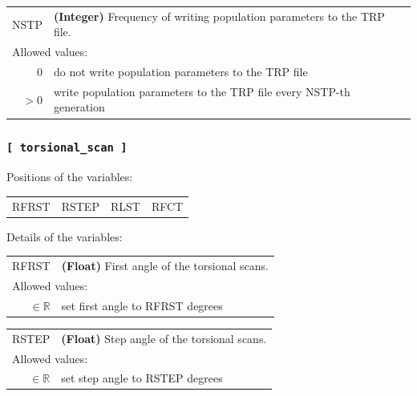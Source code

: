 \documentclass[10pt,a4paper,openany]{memoir}
\numberwithin{equation}{section}
\begin{document}
{
\begin{tabular}{r@{ : }l}
\label{descr:nstp}
      NSTP&\textbf{(Integer)} Frequency of writing population parameters to the TRP file.                                              \\ 
\multicolumn{2}{l}{Allowed values:} \\ 
     \(0\)&do not write population parameters to the TRP file                                                   \\ 
    \(>0\)&write population parameters to the TRP file every NSTP-th generation                                 \\ 
\end{tabular}
\vspace{1ex}
}


\subsubsection{\texttt{[~torsional\_scan~]}}
\label{sec:inp-torsional_scan}

Positions of the variables:
\begin{center}
  \begin{tabular}{llll}
    RFRST & RSTEP & RLST & RFCT \\
  \end{tabular}
\end{center}

\noindent Details of the variables:
\vspace{2ex}

{
\begin{tabular}{r@{ : }l}
\label{descr:rfrst}
     RFRST&\textbf{(Float)} First angle of the torsional scans.                                                                \\ 
\multicolumn{2}{l}{Allowed values:} \\ 
\(\in\mathbb{R}\)&set first angle to RFRST degrees                                                                  \\ 
\end{tabular}
\vspace{1ex}
}

{
\begin{tabular}{r@{ : }l}
\label{descr:rstep}
     RSTEP&\textbf{(Float)} Step angle of the torsional scans.                                                                    \\ 
\multicolumn{2}{l}{Allowed values:} \\ 
\(\in\mathbb{R}\)&set step angle to RSTEP degrees                                                                      \\ 
\end{tabular}
\vspace{1ex}
}
\end{document}
